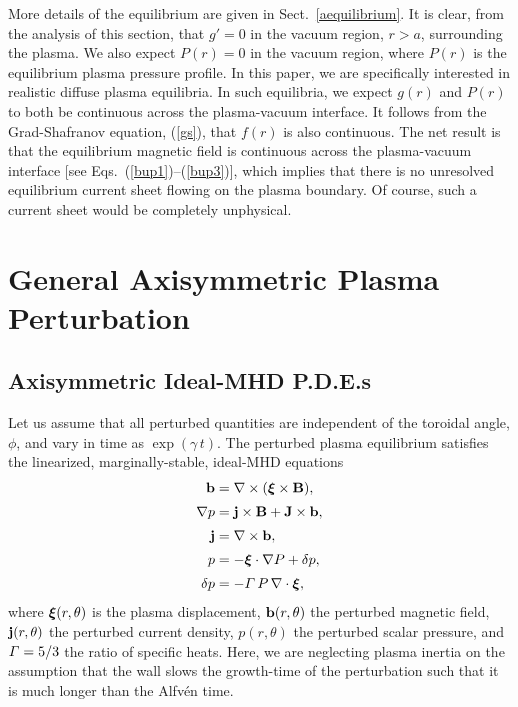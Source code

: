 \documentclass[12pt,prb,aps]{revtex4-1}
\newcommand {\bxi}{\mbox{\boldmath$\xi$}}
\begin{document}
More details of the equilibrium are given in Sect.~\ref{aequilibrium}. It is clear, from the analysis of this section, that
$g'=0$ in the vacuum region, $r>a$, surrounding the plasma. We also expect $P(r)=0$ in the vacuum region, where $P(r)$
is the equilibrium plasma pressure profile. In this paper, we are specifically interested in realistic diffuse plasma equilibria. In such equilibria, we expect $g(r)$
and $P(r)$ to both be continuous across the plasma-vacuum interface. It follows from the Grad-Shafranov equation, (\ref{gs}), that
$f(r)$ is also continuous. The net result is that the equilibrium magnetic field is continuous across the plasma-vacuum
interface [see Eqs.~(\ref{bup1})--(\ref{bup3})], which implies that there is no unresolved equilibrium current sheet flowing on the plasma boundary. Of course, such a
current sheet would be completely unphysical. 

\section{General Axisymmetric Plasma Perturbation}\label{opde}

\subsection{Axisymmetric Ideal-MHD P.D.E.s}\label{pde}
Let us assume that all perturbed quantities are independent of the toroidal angle, $\phi$,  and vary in time
as $\exp(\gamma\,t)$. 
The perturbed plasma equilibrium satisfies the  linearized, marginally-stable, ideal-MHD equations\,\cite{connor,am1,gs1}
\begin{align}
{\bf b} &= \nabla\times (\bxi\times {\bf B}),\label{e21}\\[0.5ex]
\nabla p &={\bf j}\times {\bf B}  +{\bf J}\times {\bf b},\label{e22}\\[0.5ex]
{\bf j} &= \nabla\times {\bf b},\label{e23}\\[0.5ex]
p&= -\bxi\cdot\nabla P+\delta p,\label{e24}\\[0.5ex]
\delta p &= - {\mit\Gamma}\,P\,\nabla\cdot\bxi,\label{e25ii}
\end{align}
where $\bxi(r,\theta)$ is the plasma displacement, ${\bf b}(r,\theta)$ the perturbed magnetic field,
${\bf j}(r,\theta)$ the perturbed current density, $p(r,\theta)$ the perturbed scalar pressure, and ${\mit\Gamma}=5/3$ the ratio of specific heats.
Here, we are neglecting plasma inertia on the assumption that the wall slows the growth-time of the perturbation such that it is much longer than the Alfv\'{e}n time. 
\end{document}
